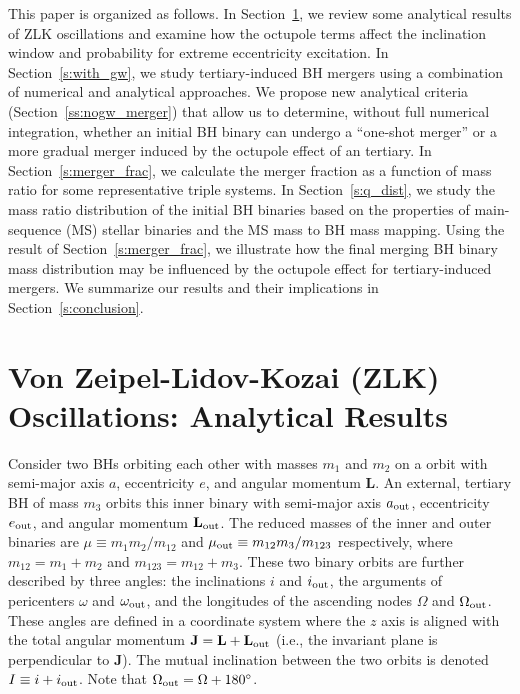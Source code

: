 \documentclass[
        fleqn,
        usenatbib,
    ]{mnras}
\newcommand*{\bm}[1]{\mathbf{#1}}
\begin{document}
This paper is organized as follows. In Section~\ref{s:background}, we review
some analytical results of ZLK oscillations and examine how the octupole terms
affect the inclination window and probability for extreme eccentricity
excitation. In Section~\ref{s:with_gw}, we study tertiary-induced BH mergers
using a combination of numerical and analytical approaches. We propose new
analytical criteria (Section~\ref{ss:nogw_merger}) that allow us to determine,
without full numerical integration, whether an initial BH binary can undergo a
``one-shot merger'' or a more gradual merger induced by the octupole effect of
an tertiary. In Section~\ref{s:merger_frac}, we calculate the merger fraction as
a function of mass ratio for some representative triple systems. In
Section~\ref{s:q_dist}, we study the mass ratio distribution of the initial BH
binaries based on the properties of main-sequence (MS) stellar binaries and the
MS mass to BH mass mapping. Using the result of Section~\ref{s:merger_frac}, we
illustrate how the final merging BH binary mass distribution may be influenced
by the octupole effect for tertiary-induced mergers. We summarize our results
and their implications in Section~\ref{s:conclusion}.

\section{Von Zeipel-Lidov-Kozai (ZLK) Oscillations: Analytical
Results}\label{s:background}

Consider two BHs orbiting each other with masses $m_1$ and $m_2$ on a orbit with
semi-major axis $a$, eccentricity $e$, and angular momentum $\bm{L}$. An external,
tertiary BH of mass $m_3$ orbits this inner binary with semi-major axis $a_{\rm
out}$, eccentricity $e_{\rm out}$, and angular momentum $\bm{L}_{\rm out}$. The
reduced masses of the inner and outer binaries are $\mu \equiv m_1m_2 / m_{12}$
and $\mu_{\rm out} \equiv m_{12} m_3 / m_{123}$ respectively, where $m_{12} =
m_1 + m_2$ and $m_{123} = m_{12} + m_3$. These two binary orbits are further
described by three angles: the inclinations $i$ and $i_{\rm out}$, the arguments
of pericenters $\omega$ and $\omega_{\rm out}$, and the longitudes of the
ascending nodes $\Omega$ and $\Omega_{\rm out}$. These angles are defined in a
coordinate system where the $z$ axis is aligned with the total angular momentum
$\bm{J} = \bm{L} + \bm{L}_{\rm out}$ (i.e., the invariant plane is perpendicular
to $\bm{J}$). The mutual inclination between the two orbits is denoted $I \equiv
i + i_{\rm out}$. Note that $\Omega_{\rm out} = \Omega + 180^\circ$.
\end{document}
